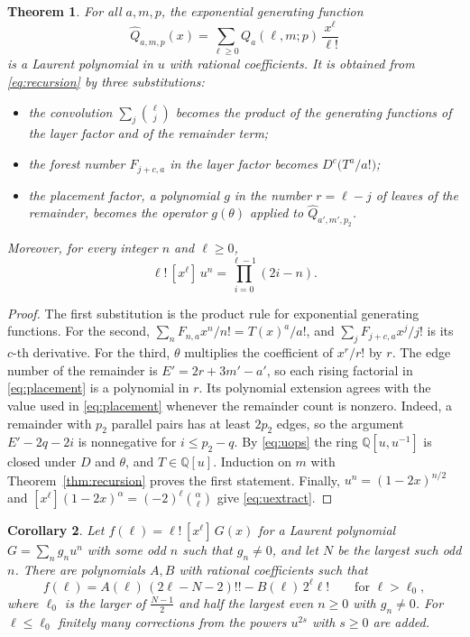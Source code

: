 \documentclass[11pt,a4paper]{article}
\newtheorem{theorem}{Theorem}[section]
\newtheorem{corollary}[theorem]{Corollary}
\theoremstyle{definition}
\begin{document}
\begin{theorem}\label{thm:closure}
For all $a,m,p$, the exponential generating function
\[
\widehat Q_{a,m,p}(x)=\sum_{\ell\ge0}Q_a(\ell,m;p)\,\frac{x^\ell}{\ell!}
\]
is a Laurent polynomial in $u$ with rational coefficients. It is obtained from \eqref{eq:recursion} by three substitutions:
\begin{itemize}
\item the convolution $\sum_j\binom{\ell}{j}$ becomes the product of the generating functions of the layer factor and of the remainder term;
\item the forest number $F_{j+c,a}$ in the layer factor becomes $D^{c}\bigl(T^a/a!\bigr)$;
\item the placement factor, a polynomial $g$ in the number $r=\ell-j$ of leaves of the remainder, becomes the operator $g(\theta)$ applied to $\widehat Q_{a',m',p_2}$.
\end{itemize}
Moreover, for every integer $n$ and $\ell\ge0$,
\begin{equation}\label{eq:uextract}
\ell!\,[x^\ell]\,u^n=\prod_{i=0}^{\ell-1}(2i-n).
\end{equation}
\end{theorem}



\begin{proof}
The first substitution is the product rule for exponential generating functions. For the second, $\sum_nF_{n,a}x^n/n!=T(x)^a/a!$, and $\sum_jF_{j+c,a}x^j/j!$ is its $c$-th derivative. For the third, $\theta$ multiplies the coefficient of $x^r/r!$ by $r$. The edge number of the remainder is $E'=2r+3m'-a'$, so each rising factorial in \eqref{eq:placement} is a polynomial in $r$. Its polynomial extension agrees with the value used in \eqref{eq:placement} whenever the remainder count is nonzero. Indeed, a remainder with $p_2$ parallel pairs has at least $2p_2$ edges, so the argument $E'-2q-2i$ is nonnegative for $i\le p_2-q$. By \eqref{eq:uops} the ring $\mathbb{Q}[u,u^{-1}]$ is closed under $D$ and $\theta$, and $T\in\mathbb{Q}[u]$. Induction on $m$ with Theorem~\ref{thm:recursion} proves the first statement. Finally, $u^n=(1-2x)^{n/2}$ and $[x^\ell](1-2x)^{\alpha}=(-2)^\ell\binom{\alpha}{\ell}$ give \eqref{eq:uextract}.
\end{proof}

\begin{corollary}\label{cor:shape}
Let $f(\ell)=\ell!\,[x^\ell]\,G(x)$ for a Laurent polynomial $G=\sum_ng_nu^n$ with some odd $n$ such that $g_n\ne0$, and let $N$ be the largest such odd $n$. There are polynomials $A,B$ with rational coefficients such that
\[
f(\ell)=A(\ell)\,(2\ell-N-2)!!-B(\ell)\,2^\ell\ell!\qquad\text{for }\ell>\ell_0,
\]
where $\ell_0$ is the larger of $\frac{N-1}{2}$ and half the largest even $n\ge0$ with $g_n\ne0$. For $\ell\le\ell_0$ finitely many corrections from the powers $u^{2s}$ with $s\ge0$ are added.
\end{corollary}
\end{document}
